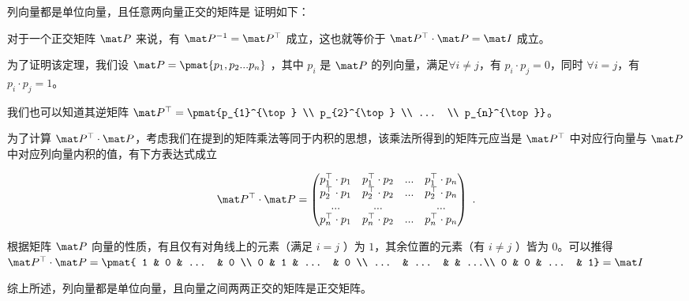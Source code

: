 \begin{theorem}{列向量都是单位向量，且任意两向量正交的矩阵是}
证明如下：

对于一个正交矩阵 $\mat P$ 来说，有 $\mat P^{-1} = \mat P^{\top} $ 成立，这也就等价于 $\mat P^{\top} \cdot \mat P = \mat I$ 成立。

为了证明该定理，我们设 $\mat P = \pmat{p_{1}, p_{2} ... p_{n}}$ ，其中 $p_{i}$ 是 $\mat P$ 的列向量，满足$\forall i \ne j$，有 $p_{i} \cdot p_{j} = 0$，同时 $\forall i = j$，有 $p_{i} \cdot p_{j} = 1$。

我们也可以知道其逆矩阵 $\mat P^{\top} = \pmat{p_{1}^{\top} \\ p_{2}^{\top} \\ ... \\ p_{n}^{\top}}$。

为了计算 $\mat P^{\top} \cdot \mat P$，考虑我们在提到的矩阵乘法等同于内积的思想，该乘法所得到的矩阵元应当是 $\mat P^{\top}$ 中对应行向量与 $\mat P$ 中对应列向量内积的值，有下方表达式成立

\begin{equation}
\mat P^{\top} \cdot \mat P = \begin{pmatrix}
p_{1}^{\top} \cdot p_{1} & p_{1}^{\top} \cdot p_{2} & ... & p_{1}^{\top} \cdot p_{n} \\
p_{2}^{\top} \cdot p_{1} & p_{2}^{\top} \cdot p_{2} & ... & p_{2}^{\top} \cdot p_{n} \\
... & ... &  & ...\\
p_{n}^{\top} \cdot p_{1} & p_{n}^{\top} \cdot p_{2} & ... & p_{n}^{\top} \cdot p_{n}
\end{pmatrix}~.\end{equation}

根据矩阵 $\mat P$ 向量的性质，有且仅有对角线上的元素（满足 $i = j$ ）为 $1$，其余位置的元素（有 $i \ne j$ ）皆为 $0$。可以推得 $\mat P^{\top} \cdot \mat P = 
\pmat{
1 & 0 & ... & 0 \\
0 & 1 & ... & 0 \\
... & ... &  & ...\\
0 & 0 & ... & 1} = \mat I$

综上所述，列向量都是单位向量，且向量之间两两正交的矩阵是正交矩阵。

\end{theorem}



